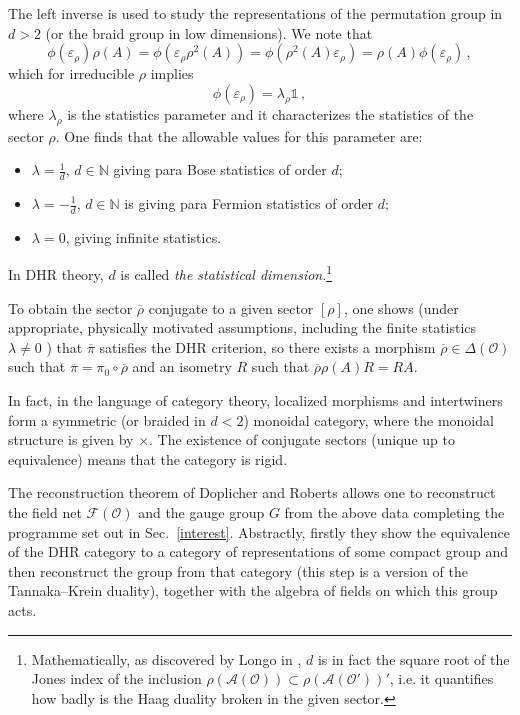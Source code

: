 \documentclass[12pt,a4paper]{article}
\newcommand{\1}{\mathds{1}}                         %
\newcommand{\NN}{\mathbb{N}}          %
\newcommand{\F}{\mathcal{F}}
\newcommand{\Ocal}{\mathcal{O}}
\newcommand{\Ac}{{\mathcal{A}}}
\begin{document}
The left inverse is used to study the representations of the permutation
group in $d>2$ (or the braid group in low dimensions). We note that
\[
\phi(\varepsilon_\rho)\rho(A)=\phi(\varepsilon_\rho\rho^2(A))=\phi(\rho^2(A)\varepsilon_\rho)=\rho(A)\phi(\varepsilon_\rho)\,,
\]
which for irreducible $\rho$ implies
\[
\phi(\varepsilon_\rho)=\lambda_\rho \1\,,
\]
where $\lambda_\rho$ is the statistics parameter and it characterizes the statistics of the sector $\rho$.  One finds that the allowable values for this parameter are:  
\begin{itemize}
\item $\lambda=\frac{1}{d}$, $d\in\NN$ giving para Bose statistics of order $d$;
\item $\lambda=-\frac{1}{d}$, $d\in\NN$ is giving para Fermion statistics of order $d$; 
\item $\lambda=0$, giving infinite statistics. 
\end{itemize}
In DHR theory, $d$ is called \emph{the statistical dimension}.\footnote{Mathematically, as discovered by Longo in \cite{Lon89}, $d$ is in fact the square root  of the Jones index of the inclusion $\rho(\Ac(\Ocal))\subset\rho(\Ac(\Ocal'))'$, i.e. it quantifies how badly is the Haag duality broken in the given sector.}

To obtain the sector $\overline{\rho}$ conjugate to a given sector $[\rho]$, one shows (under appropriate, physically motivated assumptions, including the finite statistics $\lambda\neq 0$ \cite{DHR3}) that $\overline{\pi}$ satisfies the DHR criterion, so there exists a  morphism $\overline{\rho}\in \Delta(\Ocal)$ such that $\overline{\pi}=\pi_0\circ \overline{\rho}$ and an isometry $R$ such that $\overline{\rho}\rho(A) R= RA$.


In fact, in the language of category theory, localized morphisms and intertwiners form a symmetric (or braided in $d<2$) monoidal category, where the monoidal structure is given by $\times$. The existence of conjugate sectors (unique up to equivalence) means that the category is rigid.

 The reconstruction theorem of Doplicher and Roberts \cite{DR89} allows one to reconstruct the field net $\F(\Ocal)$ and the gauge group $G$ from the above data completing the programme set out in Sec.~\ref{interest}. Abstractly, firstly they show the equivalence of the DHR category to a category of representations of some compact group and then reconstruct the group from that category (this step is a version of the Tannaka--Krein duality), together with the algebra of fields on which this group acts.
\end{document}
